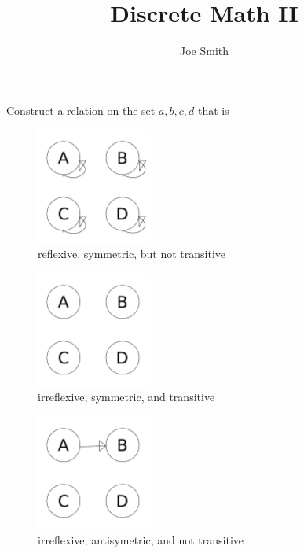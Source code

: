 \documentclass[10pt,reqno,sumlimits]{amsart}
\theoremstyle{plain}
\theoremstyle{definition}
\newcommand{\1}{{\bf 1}}
\numberwithin{equation}{section}
\begin{document}
\title[Midterm]{Discrete Math II}
\author{Joe Smith}



\maketitle



\section {}
Construct a relation on the set ${a, b, c, d}$ that is\\
\begin{figure}[htbp]
\centerline{
    \mbox{\includegraphics[width=1.5in]{1_a.pdf}}
  }
  \caption{reflexive, symmetric, but not transitive}
\end{figure}

\begin{figure}[htbp]
\centerline{
    \mbox{\includegraphics[width=1.5in]{1_b.pdf}}
  }
  \caption{irreflexive, symmetric, and transitive}
\end{figure}

\begin{figure}[htbp]
\centerline{
    \mbox{\includegraphics[width=1.5in]{1_c.pdf}}
  }
  \caption{irreflexive, antisymetric, and not transitive}
\end{figure}
\end{document}
